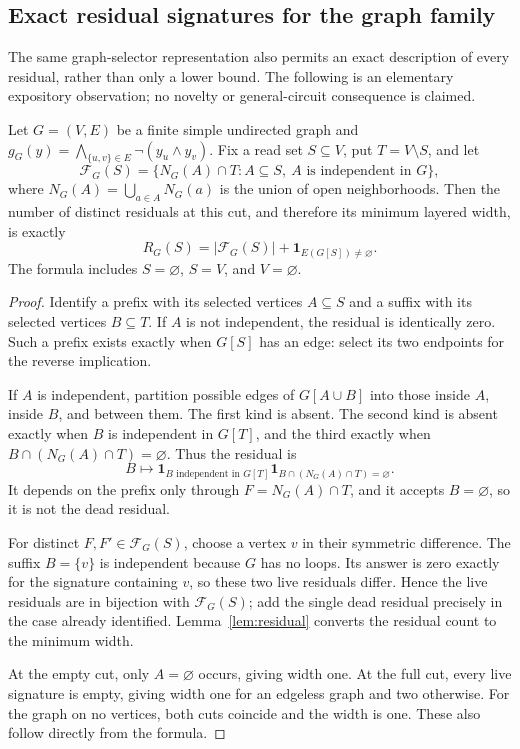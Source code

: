 \subsection{Exact residual signatures for the graph family}
The same graph-selector representation also permits an exact description of
every residual, rather than only a lower bound. The following is an elementary
expository observation; no novelty or general-circuit consequence is claimed.

\begin{lemma}
\label{lem:graph-signatures}
Let \(G=(V,E)\) be a finite simple undirected graph and
\(g_G(y)=\bigwedge_{\{u,v\}\in E}\neg(y_u\land y_v)\).
Fix a read set \(S\subseteq V\), put \(T=V\setminus S\), and let
\[
 \mathcal F_G(S)=
 \{N_G(A)\cap T:A\subseteq S,\ A\text{ is independent in }G\},
\]
where \(N_G(A)=\bigcup_{a\in A}N_G(a)\) is the union of open
neighborhoods. Then the number of distinct residuals at this cut, and
therefore its minimum layered width, is exactly
\[
 R_G(S)=|\mathcal F_G(S)|+\mathbf 1_{E(G[S])\ne\varnothing}.
\]
The formula includes \(S=\varnothing\), \(S=V\), and \(V=\varnothing\).
\end{lemma}
\begin{proof}
Identify a prefix with its selected vertices \(A\subseteq S\) and a
suffix with its selected vertices \(B\subseteq T\). If \(A\) is not
independent, the residual is identically zero. Such a prefix exists exactly
when \(G[S]\) has an edge: select its two endpoints for the reverse
implication.

If \(A\) is independent, partition possible edges of \(G[A\cup B]\)
into those inside \(A\), inside \(B\), and between them. The first kind
is absent. The second kind is absent exactly when \(B\) is independent in
\(G[T]\), and the third exactly when
\(B\cap (N_G(A)\cap T)=\varnothing\). Thus the residual is
\[
 B\longmapsto
 \mathbf 1_{B\text{ independent in }G[T]}
 \mathbf 1_{B\cap (N_G(A)\cap T)=\varnothing}.
\]
It depends on the prefix only through \(F=N_G(A)\cap T\), and it
accepts \(B=\varnothing\), so it is not the dead residual.

For distinct \(F,F'\in\mathcal F_G(S)\), choose a vertex \(v\) in
their symmetric difference. The suffix \(B=\{v\}\) is independent
because \(G\) has no loops. Its answer is zero exactly for the signature
containing \(v\), so these two live residuals differ. Hence the live
residuals are in bijection with \(\mathcal F_G(S)\); add the single
dead residual precisely in the case already identified. Lemma~\ref{lem:residual}
converts the residual count to the minimum width.

At the empty cut, only \(A=\varnothing\) occurs, giving width one.
At the full cut, every live signature is empty, giving width one for an
edgeless graph and two otherwise. For the graph on no vertices, both cuts
coincide and the width is one. These also follow directly from the formula.
\end{proof}

